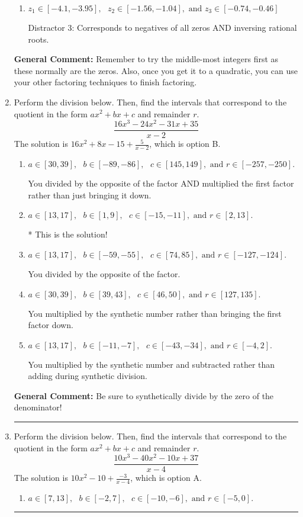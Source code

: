 \documentclass{extbook}[14pt]
\newcommand{\litem}[1]{\item #1

\rule{\textwidth}{0.4pt}}
\begin{document}
\begin{enumerate}
{\begin{enumerate}[label=\Alph*.]
 Distractor 4: Corresponds to moving factors from one rational to another.
\item \( z_1 \in [-4.1, -3.95], \text{   }  z_2 \in [-1.56, -1.04], \text{   and   } z_3 \in [-0.74, -0.46] \)

 Distractor 3: Corresponds to negatives of all zeros AND inversing rational roots.
\end{enumerate}

\textbf{General Comment:} Remember to try the middle-most integers first as these normally are the zeros. Also, once you get it to a quadratic, you can use your other factoring techniques to finish factoring.
}
\litem{
Perform the division below. Then, find the intervals that correspond to the quotient in the form $ax^2+bx+c$ and remainder $r$.
\[ \frac{16x^{3} -24 x^{2} -31 x + 35}{x -2} \]The solution is \( 16x^{2} +8 x -15 + \frac{5}{x -2} \), which is option B.\begin{enumerate}[label=\Alph*.]
\item \( a \in [30, 39], \text{   } b \in [-89, -86], \text{   } c \in [145, 149], \text{   and   } r \in [-257, -250]. \)

 You divided by the opposite of the factor AND multiplied the first factor rather than just bringing it down.
\item \( a \in [13, 17], \text{   } b \in [1, 9], \text{   } c \in [-15, -11], \text{   and   } r \in [2, 13]. \)

* This is the solution!
\item \( a \in [13, 17], \text{   } b \in [-59, -55], \text{   } c \in [74, 85], \text{   and   } r \in [-127, -124]. \)

 You divided by the opposite of the factor.
\item \( a \in [30, 39], \text{   } b \in [39, 43], \text{   } c \in [46, 50], \text{   and   } r \in [127, 135]. \)

 You multiplied by the synthetic number rather than bringing the first factor down.
\item \( a \in [13, 17], \text{   } b \in [-11, -7], \text{   } c \in [-43, -34], \text{   and   } r \in [-4, 2]. \)

 You multiplied by the synthetic number and subtracted rather than adding during synthetic division.
\end{enumerate}

\textbf{General Comment:} Be sure to synthetically divide by the zero of the denominator!
}
\litem{
Perform the division below. Then, find the intervals that correspond to the quotient in the form $ax^2+bx+c$ and remainder $r$.
\[ \frac{10x^{3} -40 x^{2} -10 x + 37}{x -4} \]The solution is \( 10x^{2} -10 + \frac{-3}{x -4} \), which is option A.\begin{enumerate}[label=\Alph*.]
\item \( a \in [7, 13], \text{   } b \in [-2, 7], \text{   } c \in [-10, -6], \text{   and   } r \in [-5, 0]. \)


\end{enumerate}}
\end{enumerate}
\end{document}
